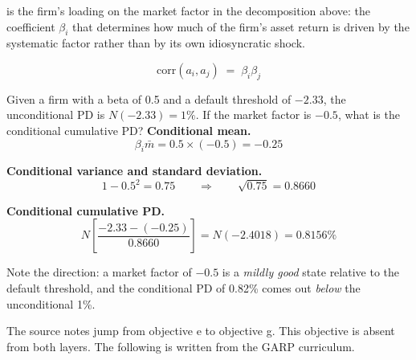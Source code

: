  is the firm's loading on the market factor in the decomposition
above: the coefficient $\beta_i$ that determines how much of the firm's asset
return is driven by the systematic factor rather than by its own idiosyncratic
shock.

\begin{crfmlbox}
\[ \mathrm{corr}(a_i, a_j) \;=\; \beta_i\beta_j \]
\end{crfmlbox}

\begin{crexbox}
Given a firm with a beta of 0.5 and a default threshold of $-2.33$, the
unconditional PD is $N(-2.33) = 1\%$. If the market factor is $-0.5$, what is the
conditional cumulative PD?
\tcblower
\textbf{Conditional mean.}
\[ \beta_i\bar{m} = 0.5 \times (-0.5) = -0.25 \]

\textbf{Conditional variance and standard deviation.}
\[ 1 - 0.5^{2} = 0.75 \qquad\Rightarrow\qquad \sqrt{0.75} = 0.8660 \]

\textbf{Conditional cumulative PD.}
\[ N\!\left[\frac{-2.33 - (-0.25)}{0.8660}\right]
   = N(-2.4018) = 0.8156\% \]

\smallskip
Note the direction: a market factor of $-0.5$ is a \emph{mildly good} state
relative to the default threshold, and the conditional PD of 0.82\% comes out
\emph{below} the unconditional 1\%.
\end{crexbox}


\gapbadge

{\footnotesize\color{FRMGrey}The source notes jump from objective e to objective
g. This objective is absent from both layers. The following is written from the
GARP curriculum.}

